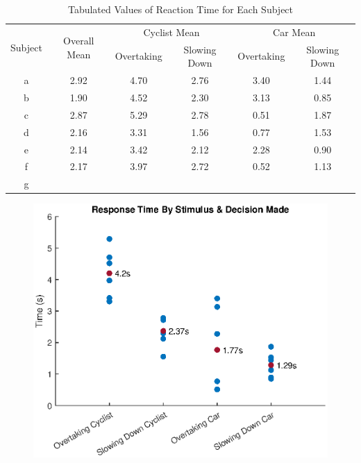 \begin{table}[hbt!]
    \begin{center}
        \caption{Tabulated Values of Reaction Time for Each Subject}
        \begin{tabular}{|c|c|cc|cc|}
        \hline
        \multirow{2}{*}{Subject} & \multirow{2}{*}{Overall Mean} & \multicolumn{2}{c|}{Cyclist Mean} & \multicolumn{2}{c|}{Car Mean}  \\ \cline{3-6} 
                                &           & Overtaking    & Slowing Down  & Overtaking & Slowing Down \\ \hline
        a                       &   2.92    & 4.70          & 2.76          & 3.40      &   1.44        \\ \hline
        b                       &   1.90    & 4.52          & 2.30          & 3.13      &   0.85        \\ \hline
        c                       &   2.87    & 5.29          & 2.78          & 0.51      &   1.87        \\ \hline
        d                       &   2.16    & 3.31          & 1.56          & 0.77      &   1.53        \\ \hline
        e                       &   2.14    & 3.42          & 2.12          & 2.28      &   0.90        \\ \hline
        f                       &   2.17    & 3.97          & 2.72          & 0.52      &   1.13        \\ \hline
        g                       &           &               &               &           &               \\ \hline
        \end{tabular}
    \end{center}
\end{table}

\begin{figure}[hbt!]
    \centering
    \includegraphics[width=0.75\linewidth]{figures/ReactionTimeMean.eps}
    \caption{}
    \label{fig:RT_Total}
\end{figure}

